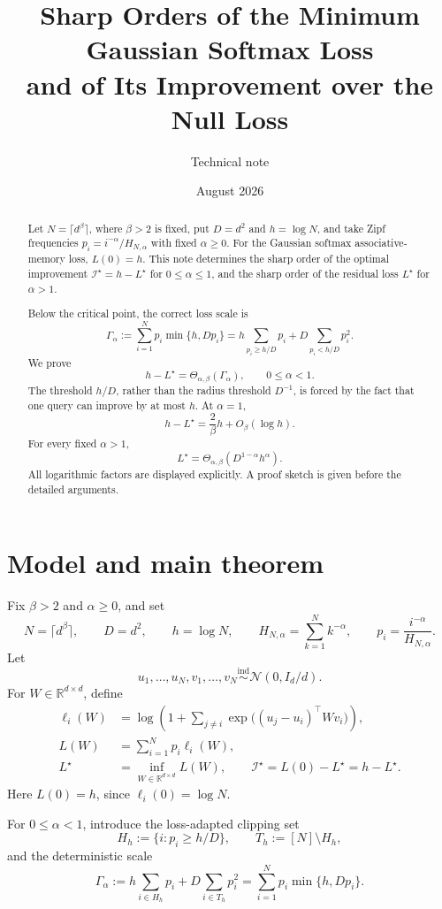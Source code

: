 \documentclass[11pt]{article}
\title{Sharp Orders of the Minimum Gaussian Softmax Loss\\
and of Its Improvement over the Null Loss}
\author{Technical note}
\date{August 2026}
\theoremstyle{remark}
\newcommand{\R}{\mathbb R}
\newcommand{\cI}{\mathcal I}
\begin{document}
\maketitle

\begin{abstract}
Let \(N=\lceil d^\beta\rceil\), where \(\beta>2\) is fixed, put
\(D=d^2\) and \(h=\log N\), and take Zipf frequencies
\(p_i=i^{-\alpha}/H_{N,\alpha}\) with fixed \(\alpha\geq0\).
For the Gaussian softmax associative-memory loss, \(L(0)=h\).
This note determines the sharp order of the optimal improvement
\(\cI^\star=h-L^\star\) for \(0\leq\alpha\leq1\), and the sharp
order of the residual loss \(L^\star\) for \(\alpha>1\).

Below the critical point, the correct loss scale is
\[
 \Gamma_\alpha
 :=\sum_{i=1}^Np_i\min\{h,Dp_i\}
 =h\sum_{p_i\geq h/D}p_i
   +D\sum_{p_i<h/D}p_i^2.
\]
We prove
\[
 h-L^\star=\Theta_{\alpha,\beta}(\Gamma_\alpha),
 \qquad 0\leq\alpha<1.
\]
The threshold \(h/D\), rather than the radius threshold \(D^{-1}\),
is forced by the fact that one query can improve by at most \(h\).
At \(\alpha=1\),
\[
 h-L^\star=\frac{2}{\beta}h+O_\beta(\log h).
\]
For every fixed \(\alpha>1\),
\[
 L^\star
 =\Theta_{\alpha,\beta}\!\left(D^{1-\alpha}h^\alpha\right).
\]
All logarithmic factors are displayed explicitly.  A proof sketch is
given before the detailed arguments.
\end{abstract}

\section{Model and main theorem}
\label{sec:model}

Fix \(\beta>2\) and \(\alpha\geq0\), and set
\[
 N=\lceil d^\beta\rceil,\qquad D=d^2,\qquad h=\log N,
 \qquad
 H_{N,\alpha}=\sum_{k=1}^Nk^{-\alpha},
 \qquad
 p_i=\frac{i^{-\alpha}}{H_{N,\alpha}}.
\]
Let
\[
 u_1,\ldots,u_N,v_1,\ldots,v_N
 \overset{\mathrm{ind}}{\sim}\mathcal N(0,I_d/d).
\]
For \(W\in\R^{d\times d}\), define
\begin{align}
 \ell_i(W)
 &=
 \log\left(1+\sum_{j\neq i}
 \exp\bigl((u_j-u_i)^\top Wv_i\bigr)\right),\\
 L(W)&=\sum_{i=1}^Np_i\ell_i(W),\\
 L^\star&=\inf_{W\in\R^{d\times d}}L(W),
 \qquad
 \cI^\star=L(0)-L^\star=h-L^\star.
 \label{eq:model}
\end{align}
Here \(L(0)=h\), since \(\ell_i(0)=\log N\).

For \(0\leq\alpha<1\), introduce the loss-adapted clipping set
\[
 H_h:=\{i:p_i\geq h/D\},\qquad T_h:=[N]\setminus H_h,
\]
and the deterministic scale
\begin{equation}
 \Gamma_\alpha
 :=h\sum_{i\in H_h}p_i+D\sum_{i\in T_h}p_i^2
 =\sum_{i=1}^Np_i\min\{h,Dp_i\}.
 \label{eq:Gamma-def}
\end{equation}
\end{document}
